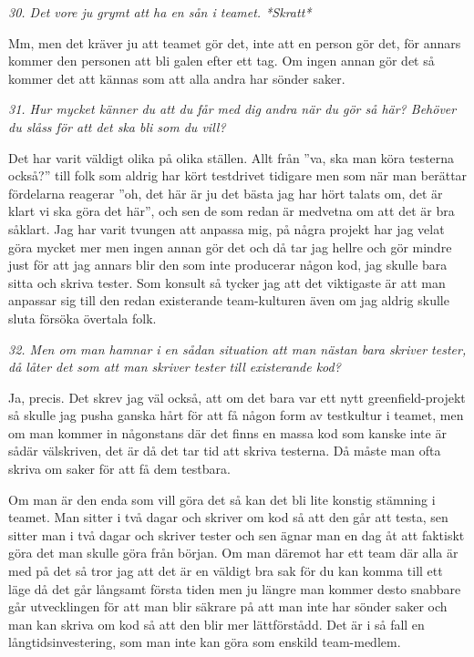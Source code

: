 \documentclass[11pt]{article}
\begin{document}
\emph{30. Det vore ju grymt att ha en sån i teamet. *Skratt*}

Mm, men det kräver ju att teamet gör det, inte att en person gör det, för annars kommer den personen att bli galen efter ett tag. Om ingen annan gör det så kommer det att kännas som att alla andra har sönder saker.

\emph{31. Hur mycket känner du att du får med dig andra när du gör så här? Behöver du slåss för att det ska bli som du vill?}

Det har varit väldigt olika på olika ställen. Allt från ”va, ska man köra testerna också?” till folk som aldrig har kört testdrivet tidigare men som när man berättar fördelarna reagerar ”oh, det här är ju det bästa jag har hört talats om, det är klart vi ska göra det här”, och sen de som redan är medvetna om att det är bra såklart. Jag har varit tvungen att anpassa mig, på några projekt har jag velat göra mycket mer men ingen annan gör det och då tar jag hellre och gör mindre just för att jag annars blir den som inte producerar någon kod, jag skulle bara sitta och skriva tester. Som konsult så tycker jag att det viktigaste är att man anpassar sig till den redan existerande team-kulturen även om jag aldrig skulle sluta försöka övertala folk.

\emph{32. Men om man hamnar i en sådan situation att man nästan bara skriver tester, då låter det som att man skriver tester till existerande kod?}

Ja, precis. Det skrev jag väl också, att om det bara var ett nytt greenfield-projekt så skulle jag pusha ganska hårt för att få någon form av testkultur i teamet, men om man kommer in någonstans där det finns en massa kod som kanske inte är sådär välskriven, det är då det tar tid att skriva testerna. Då måste man ofta skriva om saker för att få dem testbara.

Om man är den enda som vill göra det så kan det bli lite konstig stämning i teamet. Man sitter i två dagar och skriver om kod så att den går att testa, sen sitter man i två dagar och skriver tester och sen ägnar man en dag åt att faktiskt göra det man skulle göra från början. Om man däremot har ett team där alla är med på det så tror jag att det är en väldigt bra sak för du kan komma till ett läge då det går långsamt första tiden men ju längre man kommer desto snabbare går utvecklingen för att man blir säkrare på att man inte har sönder saker och man kan skriva om kod så att den blir mer lättförstådd. Det är i så fall en långtidsinvestering, som man inte kan göra som enskild team-medlem.
\end{document}
